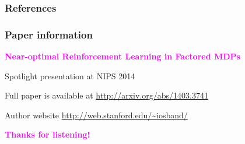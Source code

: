 \documentclass{beamer}
\newcommand{\bspace}{\vspace{3mm}}
\newcommand{\hilite}[1]{\textcolor{magenta}{\textbf{#1}}}
\begin{document}
\begin{frame}
\frametitle{References}
\tiny{


}
\end{frame}

\begin{frame}
\frametitle{Paper information}
\hilite{Near-optimal Reinforcement Learning in Factored MDPs}

Spotlight presentation at NIPS 2014

\bspace \bspace
Full paper is available at \textcolor{blue}{\url{http://arxiv.org/abs/1403.3741}}

\bspace \bspace
Author website \textcolor{blue}{\url{http://web.stanford.edu/~iosband/}}

\bspace \bspace
\hilite{Thanks for listening!}
\end{frame}
\end{document}
